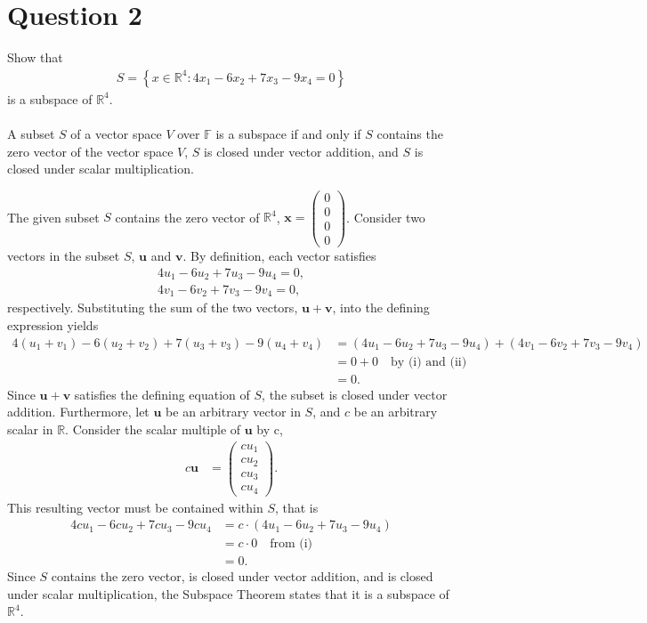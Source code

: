 \documentclass[reqno]{amsart}
\renewcommand{\vec}{\mathbf}
\newcommand{\cvec}[1]{ \begin{pmatrix} #1 \end{pmatrix} }
\begin{document}
\newpage
\section*{\LARGE{Question 2}}

	Show that
	\begin{align*}
		S = \left\{ x \in \mathbb{R}^4 : 4x_1 - 6x_2 + 7x_3 - 9x_4 = 0 \right\}
	\end{align*}
	is a subspace of $\mathbb{R}^4$.
	\\ \\
	A subset $S$ of a vector space $V$ over $\mathbb{F}$ is a subspace if and only if $S$ contains the zero vector of the vector space $V$, $S$ is closed under vector addition, and $S$ is closed under scalar multiplication.

	The given subset $S$ contains the zero vector of $\mathbb{R}^4$, $\vec{x} = \cvec{0\\0\\0\\0}$. Consider two vectors in the subset $S$, $\vec{u}$ and $\vec{v}$. By definition, each vector satisfies
	\begin{align}
		\tag{i}
		4u_1 - 6u_2 + 7u_3 - 9u_4 = 0,		\\
		\tag{ii}
		4v_1 - 6v_2 + 7v_3 - 9v_4 = 0,
	\end{align}
	respectively. Substituting the sum of the two vectors, $\vec{u} + \vec{v}$, into the defining expression yields
	\begin{align*}
		4(u_1 + v_1) - 6(u_2 + v_2) + 7(u_3 + v_3) - 9(u_4 + v_4) &= (4u_1 - 6u_2 + 7u_3 - 9u_4) + (4v_1 - 6v_2 + 7v_3 - 9v_4)	\\
																  &= 0 + 0 \quad \text{by (i) and (ii)}	\\
																  &= 0.
	\end{align*}
	Since $\vec{u} + \vec{v}$ satisfies the defining equation of $S$, the subset is closed under vector addition. Furthermore, let $\vec{u}$ be an arbitrary vector in $S$, and $c$ be an arbitrary scalar in $\mathbb{R}$. Consider the scalar multiple of $\vec{u}$ by c,
	\begin{align*}
		c\vec{u} &= \cvec{c u_1 \\ c u_2 \\ c u_3 \\ c u_4}.
	\end{align*}
	This resulting vector must be contained within $S$, that is
	\begin{align*}
		4cu_1 - 6cu_2 + 7cu_3 - 9cu_4 &= c \cdot (4u_1 - 6u_2 + 7u_3 - 9u_4)	\\
				  					  &= c \cdot 0 \quad \text{from (i)}	\\
				  					  &= 0.
	\end{align*}
	Since $S$ contains the zero vector, is closed under vector addition, and is closed under scalar multiplication, the Subspace Theorem states that it is a subspace of $\mathbb{R}^4$.
\end{document}
